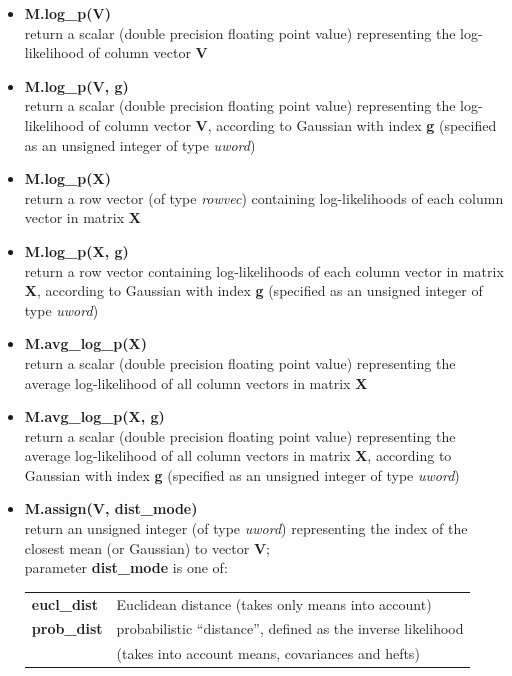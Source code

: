 \clearpage
\newpage

\begin{small}
\begin{itemize}

\item
{\bf M.log\_p(V)}\\
return a scalar (double precision floating point value) representing the log-likelihood of column vector {\bf V}

\item
{\bf M.log\_p(V, g)}\\
return a scalar (double precision floating point value) representing the log-likelihood of column vector {\bf V},
according to Gaussian with index {\bf g} (specified as an unsigned integer of type {\it uword})

\item
{\bf M.log\_p(X)}\\
return a row vector (of type {\it rowvec}) containing log-likelihoods of each column vector in matrix {\bf X}


\item
{\bf M.log\_p(X, g)}\\
return a row vector containing log-likelihoods of each column vector in matrix {\bf X},
according to Gaussian with index {\bf g}  (specified as an unsigned integer of type {\it uword})

\item
{\bf M.avg\_log\_p(X)}\\
return a scalar (double precision floating point value) representing the average log-likelihood of all column vectors in matrix {\bf X}

\item
{\bf M.avg\_log\_p(X, g)}\\
return a scalar (double precision floating point value) representing the average log-likelihood of all column vectors in matrix {\bf X},
according to Gaussian with index {\bf g}  (specified as an unsigned integer of type {\it uword})

\item
{\bf M.assign(V, dist\_mode)}\\
return an unsigned integer (of type {\it uword}) representing the index of the closest mean (or Gaussian) to vector {\bf V};\\
parameter {\bf dist\_mode} is one of:

\begin{tabular}{ll}
{\bf eucl\_dist} & Euclidean distance (takes only means into account) \\
{\bf prob\_dist} & probabilistic ``distance'', defined as the inverse likelihood\\
                 & (takes into account means, covariances and hefts)
\end{tabular}


\end{itemize}
\end{small}
